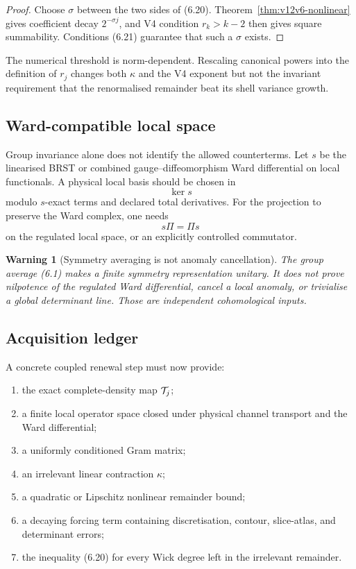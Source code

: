 \documentclass[11pt]{article}
\newtheorem{warning}[theorem]{Warning}
\theoremstyle{remark}
\begin{document}
\begin{proof}
Choose \(\sigma\) between the two sides of (6.20).
Theorem~\ref{thm:v12v6-nonlinear} gives coefficient decay
\(2^{-\sigma j}\), and V4 condition \(r_k>k-2\) then gives
square summability.  Conditions (6.21) guarantee that such a
\(\sigma\) exists.
\end{proof}

The numerical threshold is norm-dependent.  Rescaling canonical
powers into the definition of \(r_j\) changes both \(\kappa\) and the
V4 exponent but not the invariant requirement that the renormalised
remainder beat its shell variance growth.

\subsection{Ward-compatible local space}

Group invariance alone does not identify the allowed counterterms.
Let \(s\) be the linearised BRST or combined gauge--diffeomorphism
Ward differential on local functionals.  A physical local basis
should be chosen in
\[
                              \ker s
\]
modulo \(s\)-exact terms and declared total derivatives.  For the
projection to preserve the Ward complex, one needs
\[
                              s\Pi=\Pi s                     \tag{6.22}
\]
on the regulated local space, or an explicitly controlled commutator.

\begin{warning}[Symmetry averaging is not anomaly cancellation]
\label{warn:v12v6-anomaly}
The group average (6.1) makes a finite symmetry representation
unitary.  It does not prove nilpotence of the regulated Ward
differential, cancel a local anomaly, or trivialise a global
determinant line.  Those are independent cohomological inputs.
\end{warning}

\subsection{Acquisition ledger}

A concrete coupled renewal step must now provide:
\begin{enumerate}
\item the exact complete-density map \({\cal T}_j\);
\item a finite local operator space closed under physical channel
      transport and the Ward differential;
\item a uniformly conditioned Gram matrix;
\item an irrelevant linear contraction \(\kappa\);
\item a quadratic or Lipschitz nonlinear remainder bound;
\item a decaying forcing term containing discretisation, contour,
      slice-atlas, and determinant errors;
\item the inequality (6.20) for every Wick degree left in the
      irrelevant remainder.
\end{enumerate}
\end{document}
